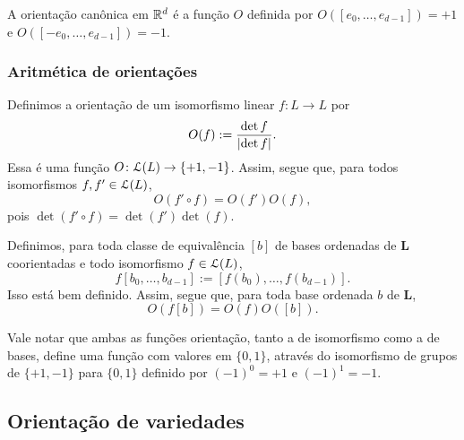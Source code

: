 A orientação canônica em $\mathbb{R}^d$ é a função $O$ definida por $O([e_0,\ldots,e_{d-1}]) = +1$ e $O([-e_0,\ldots,e_{d-1}]) = -1$.

\subsubsection{Aritmética de orientações}

Definimos a orientação de um isomorfismo linear $f\colon L \to L$ por
	\begin{equation*}
	O(f) := \frac{\det f}{\left\vert{\det f}\right\vert}.
	\end{equation*}
Essa é uma função $O\colon \mathcal{L}(L) \to \{+1,-1\}$. Assim, segue que, para todos isomorfismos $f,f' \in \mathcal{L}(L)$,
	\begin{equation*}
	O(f' \circ f) = O(f')O(f),
	\end{equation*}
pois $\det(f' \circ f) = \det(f')\det(f)$.

Definimos, para toda classe de equivalência $[b]$ de bases ordenadas de $\bm L$ coorientadas e todo isomorfismo $f \in \mathcal{L}(L)$,
	\begin{equation*}
	f[b_0, \ldots, b_{d-1}] := [f(b_0), \ldots, f(b_{d-1})].
	\end{equation*}
Isso está bem definido. Assim, segue que, para toda base ordenada $b$ de $\bm L$,
	\begin{equation*}
	O(f[b]) = O(f)O([b]).
	\end{equation*}

Vale notar que ambas as funções orientação, tanto a de isomorfismo como a de bases, define uma função com valores em $\{0,1\}$, através do isomorfismo de grupos de $\{+1,-1\}$ para $\{0,1\}$ definido por $(-1)^0 = +1$ e $(-1)^1 = -1$.

\subsection{Orientação de variedades}



